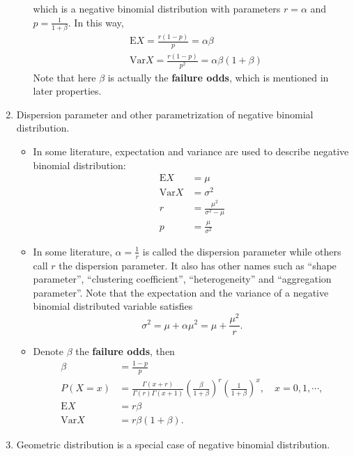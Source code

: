 \documentclass[a4paper,12pt]{article}
\begin{document}
\begin{enumerate}
\begin{itemize}
\[    \]
    which is a negative binomial distribution with parameters $r = \alpha$ and $p = \frac{1}{1 + \beta}$. In this way,
    \[
      \begin{aligned}
        & \mathrm{E}X = \frac{r\left(1 - p\right)}{p} = \alpha\beta    \\
        & \mathrm{Var}X = \frac{r\left(1 - p\right)}{p^2} = \alpha\beta\left(1 + \beta\right)
      \end{aligned}
    \]
    Note that here $\beta$ is actually the \textbf{failure odds}, which is mentioned in later properties.
  \end{itemize}
\item Dispersion parameter and other parametrization of negative binomial distribution.
  \begin{itemize}
  \item In some literature, expectation and variance are used to describe negative binomial distribution:
    \[
      \begin{aligned}
        \mathrm{E}X &= \mu    \\
        \mathrm{Var}X &= \sigma^2    \\
        r &= \frac{\mu^2}{\sigma^2 - \mu}    \\
        p &= \frac{\mu}{\sigma^2}
      \end{aligned}
    \]
  \item In some literature, $\alpha = \frac{1}{r}$ is called the dispersion parameter while others call $r$ the dispersion parameter. It also has other names such as ``shape parameter'', ``clustering coefficient'', ``heterogeneity'' and ``aggregation parameter''. Note that the expectation and the variance of a negative binomial distributed variable satisfies
    \[
      \sigma^2 = \mu + \alpha \mu^2 = \mu + \frac{\mu^2}{r}
      .
    \]
  \item Denote $\beta$ the \textbf{failure odds}, then
    \[
      \begin{aligned}
        \beta &= \frac{1- p}{p}    \\
        P\left(X = x\right) &=
        \frac{\Gamma\left(x + r\right)}{\Gamma\left(r\right)\Gamma\left(x + 1\right)}
        \left(\frac{\beta}{1 + \beta}\right)^r
        \left(\frac{1}{1 + \beta}\right)^x,
        \quad x = 0, 1, \cdots,    \\
        \mathrm{E}X &= r\beta    \\
        \mathrm{Var}X &= r\beta\left(1 + \beta\right).
      \end{aligned}
    \]
  \end{itemize}
\item Geometric distribution is a special case of negative binomial distribution.
\end{enumerate}
\end{document}
